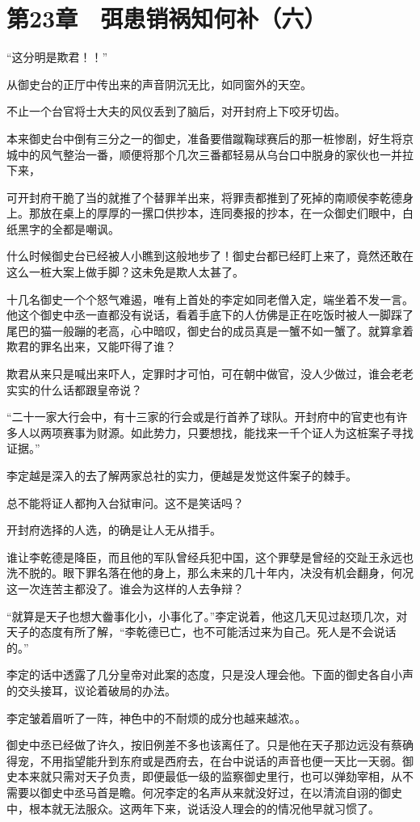 \section{第23章　弭患销祸知何补（六）}

“这分明是欺君！！”

从御史台的正厅中传出来的声音阴沉无比，如同窗外的天空。

不止一个台官将士大夫的风仪丢到了脑后，对开封府上下咬牙切齿。

本来御史台中倒有三分之一的御史，准备要借蹴鞠球赛后的那一桩惨剧，好生将京城中的风气整治一番，顺便将那个几次三番都轻易从乌台口中脱身的家伙也一并拉下来，

可开封府干脆了当的就推了个替罪羊出来，将罪责都推到了死掉的南顺侯李乾德身上。那放在桌上的厚厚的一摞口供抄本，连同奏报的抄本，在一众御史们眼中，白纸黑字的全都是嘲讽。

什么时候御史台已经被人小瞧到这般地步了！御史台都已经盯上来了，竟然还敢在这么一桩大案上做手脚？这未免是欺人太甚了。

十几名御史一个个怒气难遏，唯有上首处的李定如同老僧入定，端坐着不发一言。他这个御史中丞一直都没有说话，看着手底下的人仿佛是正在吃饭时被人一脚踩了尾巴的猫一般蹦的老高，心中暗叹，御史台的成员真是一蟹不如一蟹了。就算拿着欺君的罪名出来，又能吓得了谁？

欺君从来只是喊出来吓人，定罪时才可怕，可在朝中做官，没人少做过，谁会老老实实的什么话都跟皇帝说？

“二十一家大行会中，有十三家的行会或是行首养了球队。开封府中的官吏也有许多人以两项赛事为财源。如此势力，只要想找，能找来一千个证人为这桩案子寻找证据。”

李定越是深入的去了解两家总社的实力，便越是发觉这件案子的棘手。

总不能将证人都拘入台狱审问。这不是笑话吗？

开封府选择的人选，的确是让人无从措手。

谁让李乾德是降臣，而且他的军队曾经兵犯中国，这个罪孽是曾经的交趾王永远也洗不脱的。眼下罪名落在他的身上，那么未来的几十年内，决没有机会翻身，何况这一次连苦主都没了。谁会为这样的人去争辩？

“就算是天子也想大齤事化小，小事化了。”李定说着，他这几天见过赵顼几次，对天子的态度有所了解，“李乾德已亡，也不可能活过来为自己。死人是不会说话的。”

李定的话中透露了几分皇帝对此案的态度，只是没人理会他。下面的御史各自小声的交头接耳，议论着破局的办法。

李定皱着眉听了一阵，神色中的不耐烦的成分也越来越浓。。

御史中丞已经做了许久，按旧例差不多也该离任了。只是他在天子那边远没有蔡确得宠，不用指望能升到东府或是西府去，在台中说话的声音也便一天比一天弱。御史本来就只需对天子负责，即便最低一级的监察御史里行，也可以弹劾宰相，从不需要以御史中丞马首是瞻。何况李定的名声从来就没好过，在以清流自诩的御史中，根本就无法服众。这两年下来，说话没人理会的的情况他早就习惯了。

